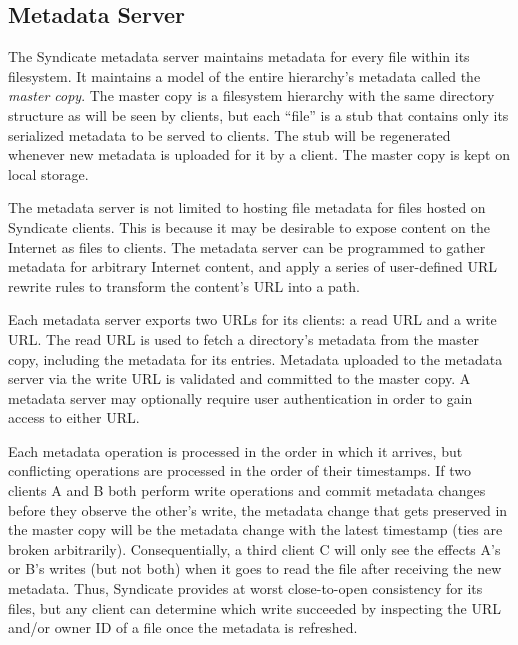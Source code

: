 \subsection{Metadata Server}

The Syndicate metadata server maintains metadata for every file within
its filesystem. It maintains a model of
the entire hierarchy's metadata called the \textit{master copy}.  The
master copy is a filesystem hierarchy with the same directory
structure as will be seen by clients, but each ``file'' is a stub that
contains only its serialized metadata to be served to clients.  The
stub will be regenerated whenever new metadata is uploaded for it by a
client.  The master copy is kept on local storage.

The metadata server is not limited to hosting file metadata for files
hosted on Syndicate clients.  This is because it may be desirable to 
expose content on the Internet as files to clients.  The metadata
server can be programmed to gather metadata for arbitrary Internet
content, and apply a series of user-defined URL rewrite rules to 
transform the content's URL into a path.

Each metadata server exports two URLs for its clients: a read URL and
a write URL.  The read URL is used to fetch a directory's metadata
from the master copy, including the metadata for its entries.  Metadata uploaded to the metadata
server via the write URL is validated and committed to the master
copy. A metadata server may optionally require user authentication in
order to gain access to either URL.

Each metadata operation is processed in the order in which it arrives,
but conflicting operations are processed in the order of their timestamps.  
If two clients A and B
both perform write operations and commit metadata changes before they observe the other's
write, the metadata change that gets preserved in the master copy will be the metadata
change with the latest timestamp (ties are broken arbitrarily).
Consequentially, a third client C will only see the effects A's or B's writes
(but not both) when it goes to read the file after receiving the new
metadata.  Thus, Syndicate provides at worst close-to-open consistency for
its files, but any client can determine which write succeeded by
inspecting the URL and/or owner ID of a file once the metadata is
refreshed.

